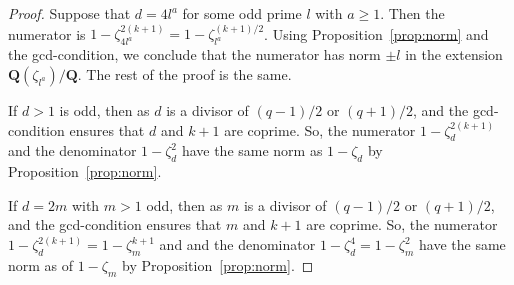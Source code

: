 \documentclass[10pt,a4paper]{amsart}
\newcommand{\Q}{\mathbf Q}
\newcommand{\cycl}[1]{\Q(\zeta_{#1})}
\begin{document}
\begin{proof}
Suppose that $d=4l^a$ for some odd prime $l$ with $a \ge 1$. Then the numerator is $1-\zeta_{4l^a}^{2(k+1)} = 1-\zeta_{l^a}^{(k+1)/2}$. Using Proposition~\ref{prop:norm} and the gcd-condition, we conclude that the numerator has norm $\pm l$ in the extension $\cycl{l^a}/\Q$. The rest of the proof is the same.

If $d>1$ is odd, then as $d$ is a divisor of $(q-1)/2$ or $(q+1)/2$, and the gcd-condition ensures that $d$ and $k+1$ are coprime. So, the numerator $1-\zeta_d^{2(k+1)}$ and the denominator $1-\zeta_d^2$ have the same norm as $1-\zeta_d$ by Proposition~\ref{prop:norm}.
	
If $d=2m$ with $m>1$ odd, then as $m$ is a divisor of $(q-1)/2$ or $(q+1)/2$, and the gcd-condition ensures that $m$ and $k+1$ are coprime. So, the numerator $1-\zeta_d^{2(k+1)}=1-\zeta_m^{k+1}$ and and the denominator $1-\zeta_d^4=1-\zeta_m^2$ have the same norm as of $1-\zeta_m$ by Proposition~\ref{prop:norm}.
\end{proof}
\end{document}
